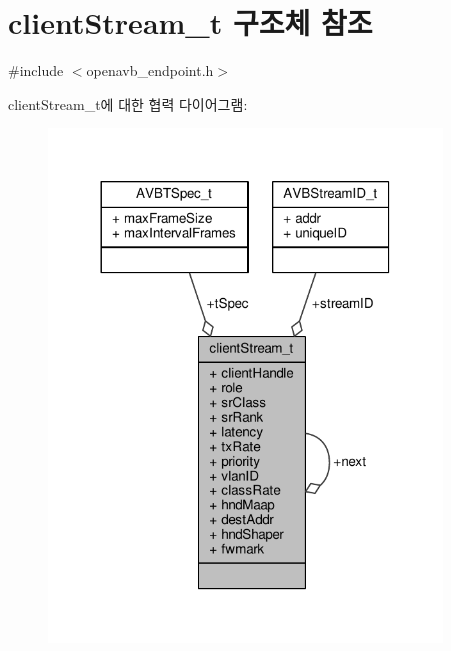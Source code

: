 \hypertarget{structclient_stream__t}{}\section{client\+Stream\+\_\+t 구조체 참조}
\label{structclient_stream__t}


{\ttfamily \#include $<$openavb\+\_\+endpoint.\+h$>$}



client\+Stream\+\_\+t에 대한 협력 다이어그램\+:
\nopagebreak
\begin{figure}[H]
\begin{center}
\leavevmode
\includegraphics[width=296pt]{structclient_stream__t__coll__graph}
\end{center}
\end{figure}
